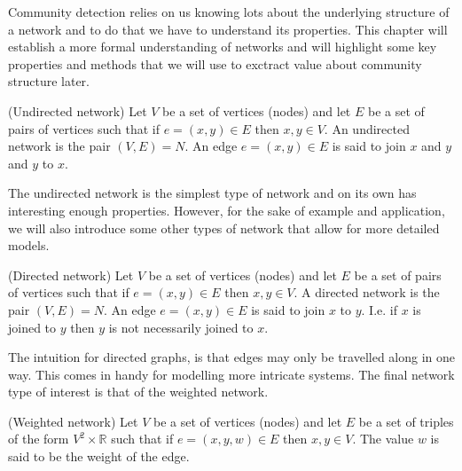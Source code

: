 Community detection relies on us knowing lots about the underlying structure of a network and to do that we have to understand its properties. This chapter will establish a more formal understanding of networks and will highlight some key properties and methods that we will use to exctract value about community structure later.

\begin{definition}{(Undirected network)}
    Let $V$ be a set of vertices (nodes) and let $E$ be a set of pairs of vertices such that if $e = (x, y) \in E$ then $x, y \in V$. An undirected network is the pair $(V, E) = N$. An edge $e = (x, y) \in E$ is said to join $x$ and $y$ and $y$ to $x$.\cite[1]{oxford:renaud_notes}\label{def:undirected_network}
\end{definition}

The undirected network is the simplest type of network and on its own has interesting enough properties. However, for the sake of example and application, we will also introduce some other types of network that allow for more detailed models.


\begin{definition}{(Directed network)}
    Let $V$ be a set of vertices (nodes) and let $E$ be a set of pairs of vertices such that if $e = (x, y) \in E$ then $x, y \in V$. A directed network is the pair $(V, E) = N$. An edge $e = (x, y) \in E$ is said to join $x$ to $y$. I.e. if $x$ is joined to $y$ then $y$ is not necessarily joined to $x$.\cite[1]{oxford:renaud_notes}\label{def:directed_network}
\end{definition}

The intuition for directed graphs, is that edges may only be travelled along in one way. This comes in handy for modelling more intricate systems. The final network type of interest is that of the weighted network.

\begin{definition}{(Weighted network)}
    Let $V$ be a set of vertices (nodes) and let $E$ be a set of triples of the form $V^2 \times \mathbb{R}$ such that if $e = (x, y, w) \in E$ then $x, y \in V$. The value $w$ is said to be the weight of the edge.\cite[1]{oxford:renaud_notes}\label{def:weighted_network}
\end{definition}

